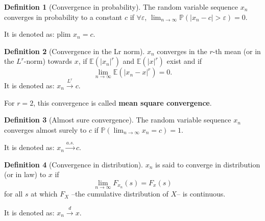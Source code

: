 \documentclass[
]{book}
\theoremstyle{definition}
\newtheorem{definition}{Definition}[chapter]
\theoremstyle{definition}
\theoremstyle{definition}
\theoremstyle{definition}
\theoremstyle{remark}
\begin{document}
\begin{definition}[Convergence in probability]
\protect\hypertarget{def:convergenceproba}{}\label{def:convergenceproba}The random variable sequence \(x_n\) converges in probability to a constant \(c\) if \(\forall \varepsilon\), \(\lim_{n \rightarrow \infty} \mathbb{P}(|x_n - c|>\varepsilon) = 0\).

It is denoted as: \(\mbox{plim } x_n = c\).
\end{definition}

\begin{definition}[Convergence in the Lr norm]
\protect\hypertarget{def:convergenceLr}{}\label{def:convergenceLr}\(x_n\) converges in the \(r\)-th mean (or in the \(L^r\)-norm) towards \(x\), if \(\mathbb{E}(|x_n|^r)\) and \(\mathbb{E}(|x|^r)\) exist and if
\[
\lim_{n \rightarrow \infty} \mathbb{E}(|x_n - x|^r) = 0.
\]
It is denoted as: \(x_n \overset{L^r}{\rightarrow} c\).

For \(r=2\), this convergence is called \textbf{mean square convergence}.
\end{definition}

\begin{definition}[Almost sure convergence]
\protect\hypertarget{def:convergenceAlmost}{}\label{def:convergenceAlmost}The random variable sequence \(x_n\) converges almost surely to \(c\) if \(\mathbb{P}(\lim_{n \rightarrow \infty} x_n = c) = 1\).

It is denoted as: \(x_n \overset{a.s.}{\rightarrow} c\).
\end{definition}

\begin{definition}[Convergence in distribution]
\protect\hypertarget{def:cvgceDistri}{}\label{def:cvgceDistri}\(x_n\) is said to converge in distribution (or in law) to \(x\) if
\[
\lim_{n \rightarrow \infty} F_{x_n}(s) = F_{x}(s)
\]
for all \(s\) at which \(F_X\) --the cumulative distribution of \(X\)-- is continuous.

It is denoted as: \(x_n \overset{d}{\rightarrow} x\).
\end{definition}
\end{document}
